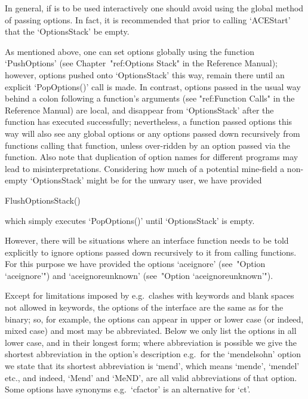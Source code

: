 \endlist

In general, if {\ACE} is to be used  interactively  one  should  avoid
using the global method of passing options. In fact, it is recommended
that prior to calling `ACEStart' that the `OptionsStack' be empty.


\beginitems

As mentioned above, one can set options globally  using  the  function
`PushOptions' (see Chapter~"ref:Options Stack" in the {\GAP} Reference
Manual); however, options pushed onto `OptionsStack' this way,  remain
there until an explicit `PopOptions()'  call  is  made.  In  contrast,
options passed in the usual way behind a colon following a  function's
arguments (see "ref:Function Calls" in the  {\GAP}  Reference  Manual)
are local, and disappear from `OptionsStack' after  the  function  has
executed successfully; nevertheless, a function  passed  options  this
way will also see any  global  options  or  any  options  passed  down
recursively from functions calling that function,  unless  over-ridden
by an option passed via the function. Also note  that  duplication  of
option names for different programs may  lead  to  misinterpretations.
Considering  how  much  of  a   potential   mine-field   a   non-empty
`OptionsStack' might be for the unwary user, we have provided

\>FlushOptionsStack()

which simply executes `PopOptions()' until `OptionsStack' is empty.

However, there will be situations where an {\ACE}  interface  function
needs to be told explicitly to ignore options passed down  recursively
to it from calling functions. For this purpose we  have  provided  the
options `aceignore' (see~"Option `aceignore'") and  `aceignoreunknown'
(see~"Option `aceignoreunknown'").

\enditems


Except for limitations imposed by {\GAP}  e.g.\  clashes  with  {\GAP}
keywords and blank spaces not allowed in keywords, the options of  the
{\ACE} interface are the same as for the binary; so, for example,  the
options can appear in upper or lower case (or indeed, mixed case)  and
most may be abbreviated. Below we only list the options in  all  lower
case, and in their longest form; where  abbreviation  is  possible  we
give the shortest abbreviation in the  option's  description  e.g.~for
the `mendelsohn' option we state that  its  shortest  abbreviation  is
`mend', which means `mende', `mendel' etc.,  and  indeed,  `Mend'  and
`MeND', are all valid abbreviations of that option. Some options  have
synonyms e.g.~`cfactor' is an alternative for `ct'.


